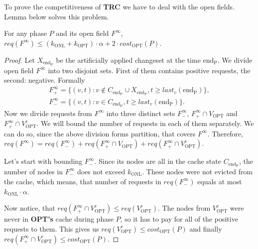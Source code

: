 
To prove the competitiveness of \textbf{TRC} we have to deal with the open 
fields. Lemma below solves this problem.
\begin{lemma}
For any phase $P$ and its open field $F^{\infty}$, $req(F^{\infty}) \leq 
(k_{\mathrm{ONL}} + k_{\mathrm{OPT}}) \cdot \alpha + 2 \cdot 
cost_{\mathrm{OPT}}(P)$.
\label{thm:inifinite_filed_bound}
\end{lemma}
\begin{proof}
Let $X_{\mathrm{end_P}}$ be the	artificially applied changeset at the time 
$\mathrm{end_P}$. We divide open field $F^{\infty}$ into two disjoint sets. 
First of them contains positive requests, the second: negative. Formally
\begin{gather*}
F^{\infty}_{+} = \{(v, t): v \notin C_{\mathrm{end_P}} \cup 
X_{\mathrm{end_P}}, t \geq last_v(\mathrm{end_P})\}, \\
F^{\infty}_{-} = \{(v, t): v \in C_{\mathrm{end_P}}, t \geq 
last_v(\mathrm{end_P})\}. 
\end{gather*}
Now we divide requests from $F^{\infty}$ into three distinct sets 
$F^{\infty}_{-}$, $F^{\infty}_{+} \cap V_{\mathrm{OPT}}$ and $F^{\infty}_{+} 
\cap V_{\mathrm{OPT}}^c$. We will bound the number of requests in each of them 
separately. We can do so, since the above division forms partition, that covers 
$F^{\infty}$. Therefore, $req(F^{\infty}) = req(F^{\infty}_{-}) + 
req(F^{\infty}_{+} \cap V_{\mathrm{OPT}}) + req(F^{\infty}_{+} \cap 
V_{\mathrm{OPT}}^c)$.

Let's start with bounding $F^{\infty}_{-}$. Since its nodes are all in the 
cache state $C_{\mathrm{end_P}}$, the number of nodes in $F^{\infty}_{-}$ does not 
exceed $k_{\mathrm{ONL}}$. These nodes were not evicted from the cache, which 
means, that number of requests in $req(F^{\infty}_{-})$ equals at most 
$k_{\mathrm{ONL}} \cdot \alpha$.

Now notice, that $req(F^{\infty}_{+} \cap V_{\mathrm{OPT}}^c) \leq 
req(V_{\mathrm{OPT}}^c)$. The nodes from $V_{\mathrm{OPT}}^c$ were never in 
\textbf{OPT's} cache during phase $P$, so it has to pay for all of the positive 
requests to them. This 
gives us $req(V_{\mathrm{OPT}}^c) \leq cost_{\mathrm{OPT}}(P)$ and finally 
$req(F^{\infty}_{+} \cap V_{\mathrm{OPT}}^c) \leq cost_{\mathrm{OPT}}(P)$.


\end{proof}
